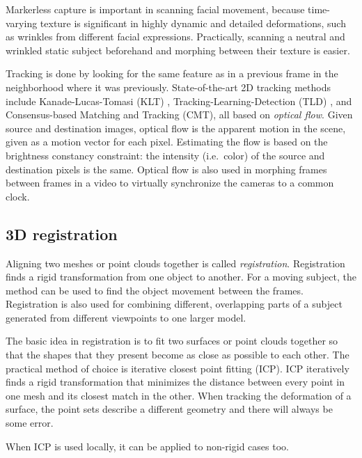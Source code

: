 Markerless capture is important in scanning facial movement, because time-varying texture is significant in highly dynamic and detailed deformations, such as wrinkles from different facial expressions.
Practically, scanning a neutral and wrinkled static subject beforehand and morphing between their texture is easier.

Tracking is done by looking for the same feature as in a previous frame in the neighborhood where it was previously.
State-of-the-art 2D tracking methods include Kanade-Lucas-Tomasi (KLT) \cite{KLT}, Tracking-Learning-Detection (TLD) \cite{TLD}, and Consensus-based Matching and Tracking (CMT), all based on \emph{optical flow}.
\cite{horn1981determining,gibson1950perception,beauchemin1995computation}
Given source and destination images, optical flow is the apparent motion in the scene, given as a motion vector for each pixel.
Estimating the flow is based on the brightness constancy constraint: the intensity (i.e.\ color) of the source and destination pixels is the same.
Optical flow is also used in morphing frames between frames in a video to virtually synchronize the cameras to a common clock. \cite{thatbradleyone}



\subsection{3D registration} %

Aligning two meshes or point clouds together is called \emph{registration}.
Registration finds a rigid transformation from one object to another.
For a moving subject, the method can be used to find the object movement between the frames.
Registration is also used for combining different, overlapping parts of a subject generated from different viewpoints to one larger model.

The basic idea in registration is to fit two surfaces or point clouds together so that the shapes that they present become as close as possible to each other.
The practical method of choice is iterative closest point fitting (ICP).
ICP iteratively finds a rigid transformation that minimizes the distance between every point in one mesh and its closest match in the other.
When tracking the deformation of a surface, the point sets describe a different geometry and there will always be some error.

When ICP is used locally, it can be applied to non-rigid cases too. \cite{brown2007global}



